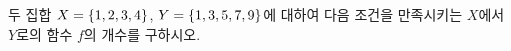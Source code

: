 두 집합 $X=\{1{,}\mkern3mu\mathopen{}2{,}\mkern3mu\mathopen{}3{,}\mkern3mu\mathopen{}4\}$, $Y=\{1{,}\mkern3mu\mathopen{}3{,}\mkern3mu\mathopen{}5{,}\mkern3mu\mathopen{}7{,}\mkern3mu\mathopen{}9\}$에 대하여 다음 조건을 만족시키는 $X$에서 $Y$로의 함수 $f$의 개수를 구하시오. 
